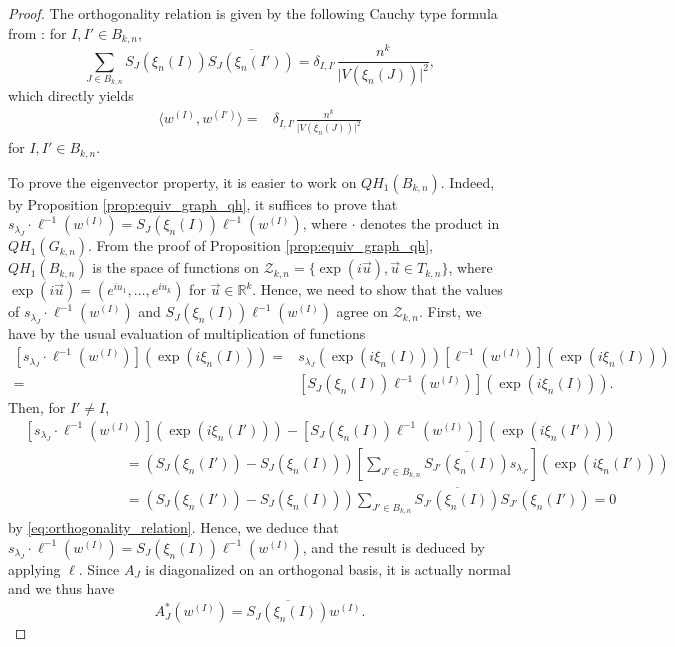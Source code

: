 \documentclass[10pt,11pt]{amsart}%
\begin{document}
\begin{proof}
The orthogonality relation is given by the following Cauchy type formula from \cite[Proposition 4.3]{Ri}: for $I,I'\in B_{k,n}$,
\begin{equation}\label{eq:first_ortho_rietsch}
\sum_{J \in B_{k,n}}S_{J}(\xi_{n}(I))\overline{S_{J}(\xi_{n}(I'))}=\delta_{I,I'}\frac{n^k}{\vert V(\xi_{n}(J))\vert^2},
\end{equation}
which directly yields
\begin{align}
\langle w^{(I)},w^{(I')}\rangle=&\delta_{I,I'}\frac{n^k}{\vert V(\xi_{n}(J))\vert^2}\label{eq:orthogonality_relation}
\end{align}
 for $I,I'\in B_{k,n}$. 
 
 To prove the eigenvector property, it is easier to work on $QH_1(B_{k,n})$. Indeed, by Proposition \ref{prop:equiv_graph_qh}, it suffices to prove that $s_{\lambda_{J}}\cdot\ell^{-1}(w^{(I)})=S_{J}(\xi_{n}(I))\ell^{-1}(w^{(I)})$, where $\cdot$ denotes the product in $QH_{1}(G_{k,n})$. From the proof of Proposition \ref{prop:equiv_graph_qh}, $QH_{1}(B_{k,n})$ is the space of functions on $\mathcal{Z}_{k,n}=\{\exp(i\vec{u}), \vec{u}\in T_{k,n}\}$, where $\exp(i\vec{u})=\left(e^{iu_1},\ldots,e^{iu_k}\right)$ for $\vec{u}\in \mathbb{R}^k$. Hence, we need to show that the values of $s_{\lambda_{J}}\cdot\ell^{-1}(w^{(I)})$ and $S_{J}(\xi_{n}(I))\ell^{-1}(w^{(I)})$ agree on $\mathcal{Z}_{k,n}$. First, we have by the usual evaluation of multiplication of functions
\begin{align*}
\left[s_{\lambda_{J}}\cdot\ell^{-1}\left(w^{(I)}\right)\right](\exp(i\xi_{n}(I)))=&s_{\lambda_{J}}(\exp(i\xi_{n}(I)))\left[\ell^{-1}\left(w^{(I)}\right)\right](\exp(i\xi_{n}(I)))\\
=&\left[S_{J}(\xi_{n}(I))\ell^{-1}(w^{(I)})\right](\exp(i\xi_{n}(I))).
\end{align*}
Then, for $I'\not=I$,
\begin{align*}
&\left[s_{\lambda_{J}}\cdot\ell^{-1}(w^{(I)})\right](\exp(i\xi_{n}(I')))-\left[S_{J}(\xi_{n}(I))\ell^{-1}(w^{(I)})\right](\exp(i\xi_{n}(I')))\\
&\hspace{3cm}=\left(S_{J}(\xi_{n}(I'))-S_{J}(\xi_{n}(I))\right)\left[\sum_{J'\in B_{k,n}}\overline{S_{J'}(\xi_{n}(I))} s_{\lambda_{J'}}\right](\exp(i\xi_{n}(I')))\\
&\hspace{3cm}=\left(S_{J}(\xi_{n}(I'))-S_{J}(\xi_{n}(I))\right)\sum_{J'\in B_{k,n}}\overline{S_{J'}(\xi_{n}(I))} S_{J'}(\xi_{n}(I'))=0
\end{align*}
by \eqref{eq:orthogonality_relation}. Hence, we deduce that $s_{\lambda_{J}}\cdot\ell^{-1}(w^{(I)})=S_{J}(\xi_{n}(I))\ell^{-1}(w^{(I)})$, and the result is deduced by applying $\ell$. Since $A_{J}$ is diagonalized on an orthogonal basis, it is actually normal and we thus have 
$$A_{J}^*\left(w^{(I)}\right)= \overline{S_{J}(\xi_{n}(I))}w^{(I)}.$$
\end{proof}
\end{document}
